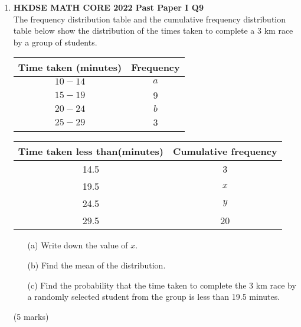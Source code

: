\documentclass[12pt]{article}
\begin{document}
\begin{enumerate}
	\item \textbf{HKDSE MATH CORE 2022 Past Paper I Q9}\\
	The frequency distribution table and the cumulative frequency distribution table below show the distribution of the times taken to complete a 3 km race by a group of students.
	\begin{table}[h]
		\centering
		\begin{minipage}{.4\textwidth}
		  \centering
		  \begin{tabular}{ | c | c | }
			\hline
			Time taken (minutes) & Frequency \\
			\hline
			$10 - 14$ & $a$ \\
			\hline			
			$15 - 19$ & 9 \\
			\hline
			$20 - 24$ & $b$ \\
			\hline
			$25 - 29$ & 3 \\
			\hline
		  \end{tabular}
		\end{minipage}
		\begin{minipage}{.5\textwidth}
		  \centering
		  \begin{tabular}{ | c | c | }
			\hline
			Time taken less than(minutes) & Cumulative frequency\\
			\hline
			14.5 & 3 \\
			\hline
			19.5 & $x$ \\
			\hline
			24.5 & $y$ \\
			\hline
			29.5 & 20 \\
			\hline
		  \end{tabular}
		\end{minipage}
		\label{tab:two_tables}
	\end{table}
	\begin{enumerate}
		\item[(a)] Write down the value of $x$.
		\item[(b)] Find the mean of the distribution.
		\item[(c)] Find the probability that the time taken to complete the 3 km race by a randomly selected student from the group is less than 19.5 minutes.
	\end{enumerate}
	(5 marks)


\end{enumerate}
\end{document}
